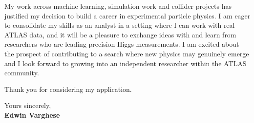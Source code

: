 \documentclass[11pt]{report}
\begin{document}
\begin{titlepage}
My work across machine learning, simulation work and collider projects has justified my decision to build a career in experimental particle physics. I am eager to consolidate my skills as an analyst in a setting where I can work with real ATLAS data, and it will be a pleasure to exchange ideas with and learn from researchers who are leading precision Higgs measurements. I am excited about the prospect of contributing to a search where new physics may genuinely emerge and I look forward to growing into an independent researcher within the ATLAS community.\\
\vspace{2em}
		
		Thank you for considering my application.\\
		\vspace{2em}
		
		\raggedright Yours sincerely,\\
		\vspace{0.9em}
		\textbf{Edwin Varghese}
		
	\end{titlepage}
\end{document}
